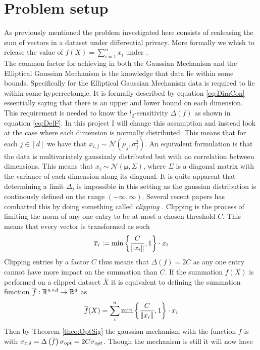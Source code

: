 \documentclass[a4paper,12pt]{article}
\begin{document}
\section{Problem setup}
\label{seq:problem}
As previously mentioned the problem investigated here consists of realeasing the sum of vectors 
in a dataset under differential privacy.
More formally we whish to release the value of 
$ f(X) = \sum_{i = 1}^n x_i  $
under \edp. \\
The common factor for achieving \edp in both the Gaussian Mechanism
and the Elliptical Gaussian Mechanism is the knowledge that data lie within some bounds.
Specifically for the Elliptical Gaussian Mechanism data is required to lie within some hyperrectangle.
It is formally described by equation \eqref{eq:DimCon} 
essentially saying that there is an upper and lower bound on each dimension.
This requirement is needed to know the $l_2$-sensitivity $ \Delta(f) $ as shown in equation \eqref{eq:DelF}.
In this project I will change this assumption and instead 
look at the case where each dimension is normally distributed.
This means that for each 
$ j \in [d] $ we have that 
$x_{i,j} \sim \mathcal{N}(\mu_j, \sigma_j^2)$.
An equivalent formulation is that the data is 
multivariately gaussianly distributed but with no correlation between dimensions.
This means that $x_i \sim \mathcal{N}(\bm{\mu}, \Sigma ) $, 
where $\Sigma$ is a diagonal matrix with the variance of each 
dimension along its diagonal.
It is quite apparent that determining a limit $ \Delta_j $ is impossible 
in this setting as the gaussian distribution is continously defined 
on the range $ (-\infty, \infty)$.
Several recent papers has combatted this by doing something called 
\textit{clipping} \cite{Huang2021,coinpress}. 
Clipping is the process of limiting the norm of any one entry 
to be at most a chosen threshold $C$. This means that every vector is transformed as such
\[
    \overline{x}_i := \min \left \{\frac{C}{\| x_i \|}, 1\right\} \cdot x_i
\]
Clipping entries by a factor $C$ thus means that $ \Delta(f) = 2C $ 
as any one entry cannot have more impact on the summation than $C$.
If the summation $f(X)$ is 
performed on a clipped dataset $\overline{X}$ it is equivalent to
defining the summation function $\overline{f}: \mathbb{R}^{n \times d} \rightarrow \mathbb{R}^d$ as
\[
    \overline{f}(X) = \sum_i^n \min \left \{ \frac{C}{\| x_i \|}, 1\right\} \cdot x_i
\]
Then by Theorem \ref{theo:OptSig} the 
gaussian mechanism with the function $\overline{f}$ is \edp with
$\sigma_{\varepsilon, \delta} = \Delta\left (\overline{f}\right) \sigma_{opt} = 2C \sigma_{opt}$.
Though the mechanism is still \edp it will now have 
\end{document}
